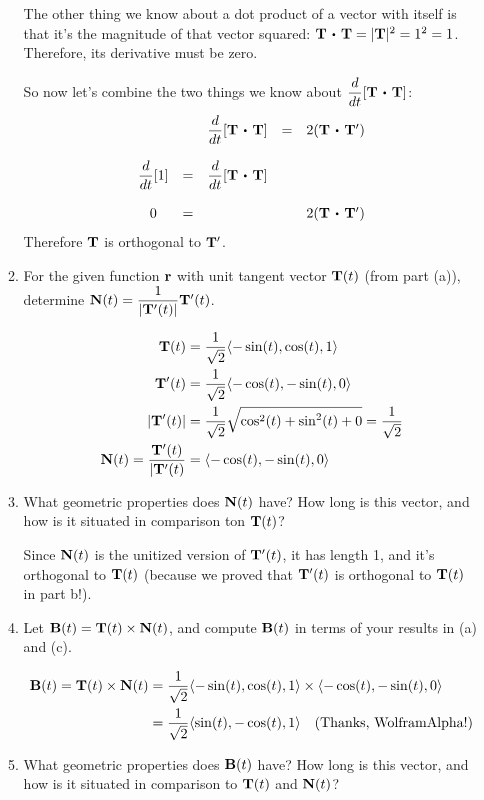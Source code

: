 \begin{enumerate}[leftmargin=0pt]
\begin{enumerate}
\begin{red}
        The other thing we know about a dot product of a vector with itself is that it's the magnitude of that vector squared: $\vT \dotp \vT = |\vT|^2 = 1^2 = 1$. Therefore, its derivative must be zero.

        So now let's combine the two things we know about $\dfrac{d}{dt}[\vT\dotp\vT]$:
        \[
        \begin{array}{ccccc}
             && \dfrac{d}{dt}[\vT\dotp\vT] &=& 2(\vT\dotp \vT') \\
             &&&&\\
             \dfrac{d}{dt}[1] &=& \dfrac{d}{dt}[\vT\dotp\vT] && \\
             &&&&\\
             0 &=& && 2(\vT\dotp \vT')
        \end{array}
        \]
        Therefore $\mathbf{T}$ is orthogonal to $\mathbf{T}'$.
    \end{red}
    \item For the given function $\mathbf{r}$ with unit tangent vector $\mathbf{T}(t)$ (from part (a)), determine $\mathbf{N}(t) = \dfrac{1}{|\mathbf{T}'(t)|} \mathbf{T}'(t)$.
    \begin{red}
        \begin{align*}
            \mathbf{T}(t)&= \dfrac{1}{\sqrt{2}} \langle -\sin(t), \cos(t), 1 \rangle \\
            \mathbf{T}'(t) &= \dfrac{1}{\sqrt{2}} \langle -\cos(t), -\sin(t), 0 \rangle \\
            |\mathbf{T}'(t)| &= \dfrac{1}{\sqrt{2}}\sqrt{\cos^2(t) + \sin^2(t)+0} = \dfrac{1}{\sqrt{2}} \\
            \mathbf{N}(t) = \dfrac{\mathbf{T}'(t)}{|\mathbf{T}'(t)}
            &= \langle -\cos(t), -\sin(t), 0 \rangle
        \end{align*}
    \end{red}
    \item What geometric properties does $\mathbf{N}(t)$ have? How long is this vector, and how is it situated in comparison ton $\mathbf{T}(t)$?

    \begin{red}
        Since $\mathbf{N}(t)$ is the unitized version of $\mathbf{T}'(t)$, it has length 1, and it's orthogonal to $\mathbf{T}(t)$ (because we proved that $\mathbf{T}'(t)$ is orthogonal to $\mathbf{T}(t)$ in part b!).
    \end{red}
    \item Let $\mathbf{B}(t) = \mathbf{T}(t) \times \mathbf{N}(t)$, and compute $\mathbf{B}(t)$ in terms of your results in (a) and (c).
    \begin{red}
        \begin{align*}
            \mathbf{B}(t) = \mathbf{T}(t) \times \mathbf{N}(t) 
            &= \dfrac{1}{\sqrt{2}} \langle -\sin(t), \cos(t), 1 \rangle \times \langle -\cos(t), -\sin(t), 0 \rangle \\
            &= \dfrac{1}{\sqrt{2}} \langle \sin(t), -\cos(t), 1 \rangle \quad \text{(Thanks, WolframAlpha!)}
        \end{align*}
    \end{red}
    \item What geometric properties does $\mathbf{B}(t)$ have? How long is this vector, and how is it situated in comparison to $\mathbf{T}(t)$ and $\mathbf{N}(t)$?


\end{enumerate}
\end{enumerate}
